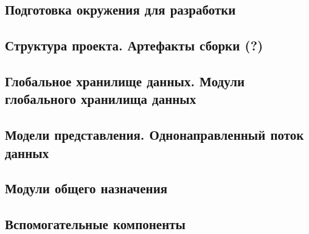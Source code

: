 
\subsection{Подготовка окружения для разработки}

\subsection{Структура проекта. Артефакты сборки (?)}

\subsection{Глобальное хранилище данных. Модули глобального хранилища данных}

\subsection{Модели представления. Однонаправленный поток данных}

\subsection{Модули общего назначения}

\subsection{Вспомогательные компоненты}

\newpage
